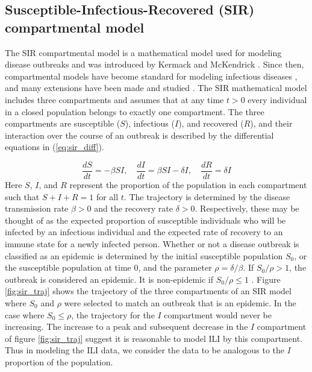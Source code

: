 \subsection{Susceptible-Infectious-Recovered (SIR) compartmental model} \label{sec:sir_func}

The SIR compartmental model is a mathematical model used for modeling disease 
outbreaks and was introduced by Kermack and McKendrick 
\cite[]{kermack1927contribution}. Since then, compartmental models have 
become standard for modeling infectious diseases 
\cite[]{allen2008mathematical}, and many extensions have been made and 
studied \cite[for example]{simon2020sir, allen2017primer, van2008deterministic}. 
The SIR mathematical model includes three compartments and assumes that at 
any time $t>0$ every individual in a closed population belongs to exactly 
one compartment. The three compartments are susceptible ($S$), infectious ($I$), 
and recovered ($R$), and their interaction over the course of an outbreak is 
described by the differential equations in (\ref{eq:sir_diff}).    

\begin{equation}
    \label{eq:sir_diff}
    \frac{dS}{dt} = -\beta SI, \quad \frac{dI}{dt} = \beta S I - \delta I, \quad \frac{dR}{dt} = \delta I
\end{equation}
Here $S$, $I$, and $R$ represent the proportion of the population in each 
compartment such that $S + I + R = 1$ for all $t$. The trajectory is 
determined by the disease transmission rate $\beta > 0$ and the recovery 
rate $\delta > 0$. Respectively, these may be thought of as the expected 
proportion of susceptible individuals who will be infected by an infectious 
individual and the expected rate of recovery to an immune state for a newly 
infected person. Whether or not a disease outbreak is classified as an 
epidemic is determined by the initial susceptible population $S_0$, or the 
susceptible population at time $0$, and the parameter $\rho = \delta/
\beta$. If $S_0/\rho > 1$, the outbreak is considered an epidemic. It is 
non-epidemic if $S_0/\rho \leq 1$ \cite[]{osthus2019dynamic}. Figure 
\ref{fig:sir_traj} shows the trajectory of the three compartments of an SIR 
model where $S_0$ and $\rho$ were selected to match an outbreak that is an 
epidemic. In the case where $S_0 \leq \rho$, the trajectory for the $I$ 
compartment would never be increasing. The increase to a peak and subsequent 
decrease in the $I$ compartment of figure \ref{fig:sir_traj} suggest it is 
reasonable to model ILI by this compartment. Thus in modeling the ILI data, 
we consider the data to be analogous to the $I$ proportion of the population.

